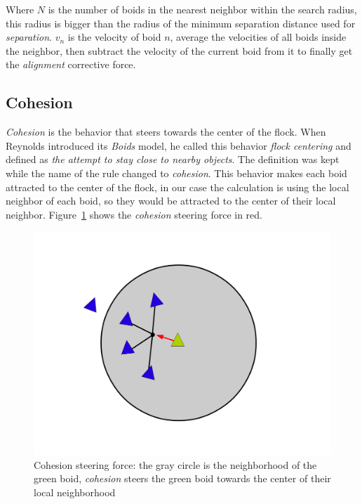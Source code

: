 Where $N$ is the number of boids in the nearest neighbor within the search radius, this radius is bigger than the radius of the minimum separation distance used for \textit{separation}. $v_n$ is the velocity of boid $n$, average the velocities of all boids inside the neighbor, then subtract the velocity of the current boid from it to finally get the \textit{alignment} corrective force.

\subsection{Cohesion}
\textit{Cohesion} is the behavior that steers towards the center of the flock. When Reynolds introduced its \textit{Boids} model, he called this behavior \textit{flock centering} and defined as \textit{the attempt to stay close to nearby objects}. The definition was kept while the name of the rule changed to \textit{cohesion}. This behavior makes each boid attracted to the center of the flock, in our case the calculation is using the local neighbor of each boid, so they would be attracted to the center of their local neighbor.  Figure~\ref{cohesionPDF} shows the \textit{cohesion} steering force in red.

\begin{figure}[htbp]
\begin{center}
\includegraphics[scale=0.3]{figures/cohesion.pdf}
\caption{Cohesion steering force: the gray circle is the neighborhood of the green boid, \textit{cohesion} steers the green boid towards the center of their local neighborhood}
\label{cohesionPDF}
\end{center}
\end{figure}

